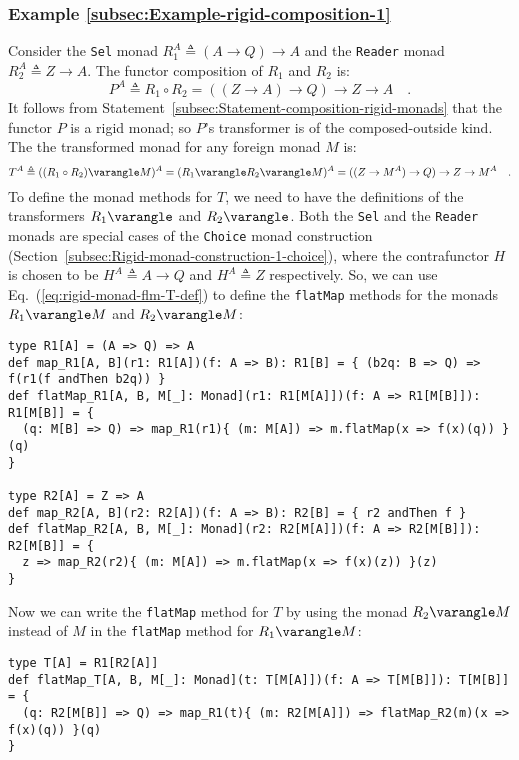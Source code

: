 \subsubsection{Example \label{subsec:Example-rigid-composition-1}\ref{subsec:Example-rigid-composition-1}}

Consider the \lstinline!Sel! monad $R_{1}^{A}\triangleq\left(A\rightarrow Q\right)\rightarrow A$
and the \lstinline!Reader! monad $R_{2}^{A}\triangleq Z\rightarrow A$.
The functor composition of $R_{1}$ and $R_{2}$ is:
\[
P^{A}\triangleq R_{1}\circ R_{2}=((Z\rightarrow A)\rightarrow Q)\rightarrow Z\rightarrow A\quad.
\]
It follows from Statement~\ref{subsec:Statement-composition-rigid-monads}
that the functor $P$ is a rigid monad; so $P$\textsf{'}s transformer is of
the composed-outside kind. The the transformed monad for any foreign
monad $M$ is:
\[
T^{A}\triangleq((R_{1}\circ R_{2})\varangle M)^{A}=(R_{1}\varangle R_{2}\varangle M)^{A}=((Z\rightarrow M^{A})\rightarrow Q)\rightarrow Z\rightarrow M^{A}\quad.
\]
To define the monad methods for $T$, we need to have the definitions
of the transformers $R_{1}\varangle$ and $R_{2}\varangle$. Both
the \lstinline!Sel! and the \lstinline!Reader! monads are special
cases of the \lstinline!Choice! monad construction (Section~\ref{subsec:Rigid-monad-construction-1-choice}),
where the contrafunctor $H$ is chosen to be $H^{A}\triangleq A\rightarrow Q$
and $H^{A}\triangleq Z$ respectively. So, we can use Eq.~(\ref{eq:rigid-monad-flm-T-def})
to define the \lstinline!flatMap! methods for the monads $R_{1}\varangle M$
and $R_{2}\varangle M$:
\begin{lstlisting}
type R1[A] = (A => Q) => A
def map_R1[A, B](r1: R1[A])(f: A => B): R1[B] = { (b2q: B => Q) => f(r1(f andThen b2q)) }
def flatMap_R1[A, B, M[_]: Monad](r1: R1[M[A]])(f: A => R1[M[B]]): R1[M[B]] = {
  (q: M[B] => Q) => map_R1(r1){ (m: M[A]) => m.flatMap(x => f(x)(q)) }(q)
}

type R2[A] = Z => A
def map_R2[A, B](r2: R2[A])(f: A => B): R2[B] = { r2 andThen f }
def flatMap_R2[A, B, M[_]: Monad](r2: R2[M[A]])(f: A => R2[M[B]]): R2[M[B]] = {
  z => map_R2(r2){ (m: M[A]) => m.flatMap(x => f(x)(z)) }(z)
}   
\end{lstlisting}
Now we can write the \lstinline!flatMap! method for $T$ by using
the monad $R_{2}\varangle M$ instead of $M$ in the \lstinline!flatMap!
method for $R_{1}\varangle M$:
\begin{lstlisting}
type T[A] = R1[R2[A]]
def flatMap_T[A, B, M[_]: Monad](t: T[M[A]])(f: A => T[M[B]]): T[M[B]] = {
  (q: R2[M[B]] => Q) => map_R1(t){ (m: R2[M[A]]) => flatMap_R2(m)(x => f(x)(q)) }(q)
}
\end{lstlisting}


